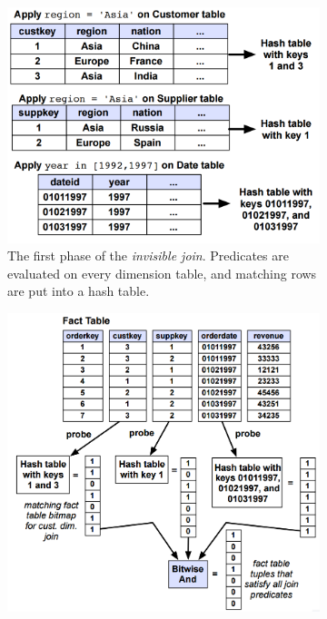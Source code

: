 \begin{figure}
  \centering
  \begin{subfigure}{0.48\textwidth}
    \includegraphics[width=\textwidth]{img/invisible-join-1.png}
    \caption{The first phase of the \textit{invisible join}. Predicates are evaluated on every dimension table, and matching rows are put into a hash table.}
    \label{fig:invisible-join-1} 
  \end{subfigure}
  \begin{subfigure}{0.48\textwidth}
    \includegraphics[width=\textwidth]{img/invisible-join-2.png}

\end{subfigure}
\end{figure}
